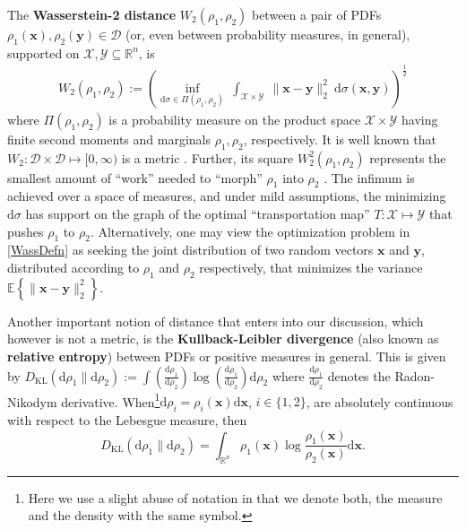 \documentclass[letterpaper,10pt,twocolumn,conference]{ieeeconf}
\newcommand{\cX}{{\mathcal X}}
\newcommand{\cY}{{\mathcal Y}}
\newcommand{\cD}{{\mathscr{D}}}
\newcommand{\bbx}{{\bm{x}}}
\newcommand{\bby}{{\bm{y}}}
\begin{document}
The \textbf{Wasserstein-2 distance} $W_{2}\left(\rho_1,\rho_2\right)$ between a pair of PDFs $\rho_1(\bm{x}),\rho_2(\bm{y})\in\cD$ (or, even between probability measures, in general), supported on $\mathcal{X}, \mathcal{Y} \subseteq \mathbb{R}^{n}$, is
\begin{align}
\!\!\!\!W_{2}\left(\rho_1,\rho_2\right) := \left(\underset{\mathrm{d}\sigma\in\Pi(\rho_1,\rho_2)}{\inf} \: \!\int_{\mathcal{X} \times \mathcal{Y}}\: \!\!\!\!\!\!\!\!\|\bm{x} - \bm{y}\|_{2}^{2} \:\mathrm{d}\sigma(\bm{x},\bm{y})\!\right)^{\frac{1}{2}}
\label{WassDefn}	
\end{align}
where $\Pi\left(\rho_1, \rho_2\right)$ is a probability measure on the product space $\cX\times \cY$ having finite second moments and marginals $\rho_1,\rho_2$, respectively.
It is well known that $W_{2} : \cD \times \cD \mapsto [0,\infty)$ is a metric \cite[p.\ 208]{VillaniBook2003}. Further, its square $W_2^2(\rho_1,\rho_2)$ represents the smallest amount of ``work'' needed to ``morph'' $\rho_1$ into $\rho_2$ \cite{French}. The infimum is achieved over a space of measures, and under mild assumptions, the minimizing $\mathrm{d}\sigma$ has support on the graph of the optimal ``transportation map'' $T:\cX\mapsto\cY$ that pushes $\rho_1$ to $\rho_2$. Alternatively, one may view the optimization problem in  \eqref{WassDefn} as seeking the joint distribution of two random vectors $\bbx$ and $\bby$, distributed according to $\rho_1$ and $\rho_2$ respectively, that minimizes the variance $\mathbb{E}\left\{\|\bbx-\bby\|_{2}^2\right\}$.

Another important notion of distance that enters into our discussion, which however is not a metric, is the {\bf Kullback-Leibler divergence} (also known as {\bf relative entropy}) between PDFs or positive measures in general. This is given by
$
D_{\mathrm{KL}}\left(\mathrm{d}\rho_1\|\mathrm{d}\rho_2\right):=\int (\frac{\mathrm{d}\rho_1}{\mathrm{d}\rho_2})\log(\frac{\mathrm{d}\rho_1}{\mathrm{d}\rho_2})\mathrm{d}\rho_2
$
where $\frac{\mathrm{d}\rho_1}{\mathrm{d}\rho_2}$ denotes the Radon-Nikodym derivative. When\footnote{Here we use a slight abuse of notation in that we denote both, the measure and the density with the same symbol.}$\mathrm{d}\rho_i=\rho_i(\bbx)\mathrm{d}\bbx$, $i\in\{1,2\}$, are absolutely continuous with respect to the Lebesgue measure, then \[D_{\mathrm{KL}}\left(\mathrm{d}\rho_1\|\mathrm{d}\rho_2\right)=\int_{\mathbb{R}^{n}} \rho_1(\bm{x})\log\frac{\rho_1(\bm{x})}{\rho_2(\bm{x})}\mathrm{d}\bbx.\]
\end{document}

